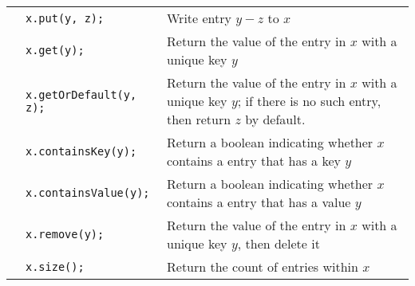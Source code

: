 \documentclass{article}
\begin{document}
\begin{center}
\begin{tabularx}{\textwidth}{llX}
                                       & \lstinline|x.put(y, z);| & Write entry \(y-z\) to \(x\)\\
                                       & \lstinline|x.get(y);| & Return the value of the entry in \(x\) with a unique key \(y\)\\
                                       & \lstinline|x.getOrDefault(y, z);| & Return the value of the entry in \(x\) with a unique key \(y\); if there is no such entry, then return \(z\) by default.\\
                                       & \lstinline|x.containsKey(y);| & Return a boolean indicating whether \(x\) contains a entry that has a key \(y\)\\
                                       & \lstinline|x.containsValue(y);| & Return a boolean indicating whether \(x\) contains a entry that has a value \(y\)\\
                                       & \lstinline|x.remove(y);| & Return the value of the entry in \(x\) with a unique key \(y\), then delete it\\
                                       & \lstinline|x.size();| & Return the count of entries within \(x\)
\\\bottomrule\end{tabularx}\end{center}





\end{document}

